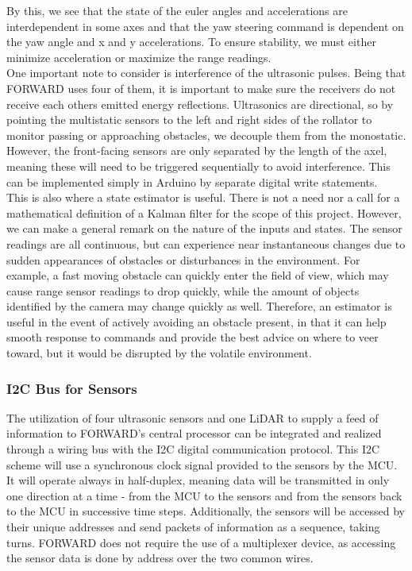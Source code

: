 \noindent By this, we see that the state of the euler angles and accelerations are interdependent in some axes and that the yaw steering command is dependent on the yaw angle and x and y accelerations. To ensure stability, we must either minimize acceleration or maximize the range readings.\\

\noindent One important note to consider is interference of the ultrasonic pulses. Being that FORWARD uses four of them, it is important to make sure the receivers do not receive each others emitted energy reflections. Ultrasonics are directional, so by pointing the multistatic sensors to the left and right sides of the rollator to monitor passing or approaching obstacles, we decouple them from the monostatic. However, the front-facing sensors are only separated by the length of the axel, meaning these will need to be triggered sequentially to avoid interference. This can be implemented simply in Arduino by separate digital write statements.\\

\noindent This is also where a state estimator is useful. There is not a need nor a call for a mathematical definition of a Kalman filter for the scope of this project. However, we can make a general remark on the nature of the inputs and states. The sensor readings are all continuous, but can experience near instantaneous changes due to sudden appearances of obstacles or disturbances in the environment. For example, a fast moving obstacle can quickly enter the field of view, which may cause range sensor readings to drop quickly, while the amount of objects identified by the camera may change quickly as well. Therefore, an estimator is useful in the event of actively avoiding an obstacle present, in that it can help smooth response to commands and provide the best advice on where to veer toward, but it would be disrupted by the volatile environment.\\

\subsubsection{I2C Bus for Sensors}
\noindent The utilization of four ultrasonic sensors and one LiDAR to supply a feed of information to FORWARD's central processor can be integrated and realized through a wiring bus with the I2C digital communication protocol. This I2C scheme will use a synchronous clock signal provided to the sensors by the MCU. It will operate always in half-duplex, meaning data will be transmitted in only one direction at a time - from the MCU to the sensors and from the sensors back to the MCU in successive time steps. Additionally, the sensors will be accessed by their unique addresses and send packets of information as a sequence, taking turns. FORWARD does not require the use of a multiplexer device, as accessing the sensor data is done by address over the two common wires.\\